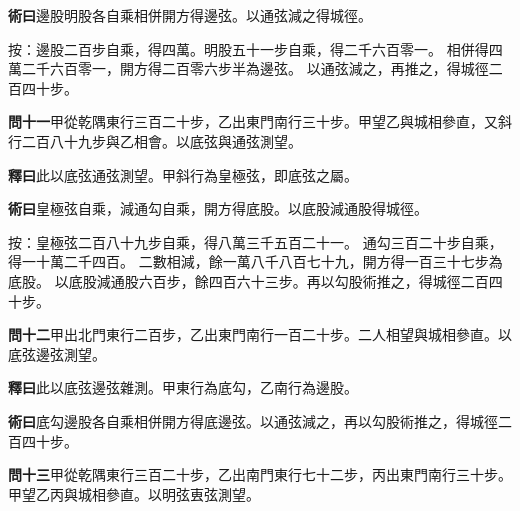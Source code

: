 \documentclass[12pt,a4paper]{article}
\begin{document}
\vspace{0.3em}

\noindent\textbf{術曰}\quad 邊股明股各自乘相併開方得邊弦。以通弦減之得城徑。

\vspace{0.3em}

\noindent
按：邊股二百步自乘，得四萬。明股五十一步自乘，得二千六百零一。
相併得四萬二千六百零一，開方得二百零六步半為邊弦。
以通弦減之，再推之，得城徑二百四十步。

\vspace{0.5em}

\noindent\textbf{問十一}\quad 甲從乾隅東行三百二十步，乙出東門南行三十步。甲望乙與城相參直，又斜行二百八十九步與乙相會。以底弦與通弦測望。

\vspace{0.3em}

\noindent\textbf{釋曰}\quad 此以底弦通弦測望。甲斜行為皇極弦，即底弦之屬。

\vspace{0.3em}

\noindent\textbf{術曰}\quad 皇極弦自乘，減通勾自乘，開方得底股。以底股減通股得城徑。

\vspace{0.3em}

\noindent
按：皇極弦二百八十九步自乘，得八萬三千五百二十一。
通勾三百二十步自乘，得一十萬二千四百。
二數相減，餘一萬八千八百七十九，開方得一百三十七步為底股。
以底股減通股六百步，餘四百六十三步。再以勾股術推之，得城徑二百四十步。

\vspace{0.5em}

\noindent\textbf{問十二}\quad 甲出北門東行二百步，乙出東門南行一百二十步。二人相望與城相參直。以底弦邊弦測望。

\vspace{0.3em}

\noindent\textbf{釋曰}\quad 此以底弦邊弦雜測。甲東行為底勾，乙南行為邊股。

\vspace{0.3em}

\noindent\textbf{術曰}\quad 底勾邊股各自乘相併開方得底邊弦。以通弦減之，再以勾股術推之，得城徑二百四十步。

\vspace{0.5em}

\noindent\textbf{問十三}\quad 甲從乾隅東行三百二十步，乙出南門東行七十二步，丙出東門南行三十步。甲望乙丙與城相參直。以明弦叀弦測望。

\vspace{0.3em}
\end{document}
